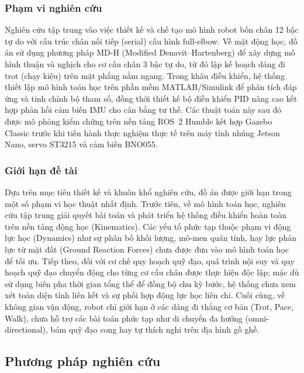\subsubsection*{Phạm vi nghiên cứu}

Nghiên cứu tập trung vào việc thiết kế và chế tạo mô hình robot bốn chân 12 bậc tự do với cấu trúc chân nối tiếp (serial) cấu hình full-elbow. Về mặt động học, đồ án sử dụng phương pháp MD-H (Modified Denavit--Hartenberg) để xây dựng mô hình thuận và nghịch cho cơ cấu chân 3 bậc tự do, từ đó lập kế hoạch dáng đi trot (chạy kiệu) trên mặt phẳng nằm ngang. Trong khâu điều khiển, hệ thống thiết lập mô hình toán học trên phần mềm MATLAB/Simulink để phân tích đáp ứng và tinh chỉnh bộ tham số, đồng thời thiết kế bộ điều khiển PID nâng cao kết hợp phản hồi cảm biến IMU cho cân bằng tư thế. Các thuật toán này sau đó được mô phỏng kiểm chứng trên nền tảng ROS~2 Humble kết hợp Gazebo Classic trước khi tiến hành thực nghiệm thực tế trên máy tính nhúng Jetson Nano, servo ST3215 và cảm biến BNO055.

\subsubsection*{Giới hạn đề tài}

Dựa trên mục tiêu thiết kế và khuôn khổ nghiên cứu, đồ án được giới hạn trong một số phạm vi học thuật nhất định. Trước tiên, về mô hình toán học, nghiên cứu tập trung giải quyết bài toán và phát triển hệ thống điều khiển hoàn toàn trên nền tảng động học (Kinematics). Các yếu tố phức tạp thuộc phạm vi động lực học (Dynamics) như sự phân bố khối lượng, mô-men quán tính, hay lực phản lực từ mặt đất (Ground Reaction Forces) chưa được đưa vào mô hình toán học để tối ưu. Tiếp theo, đối với cơ chế quy hoạch quỹ đạo, quá trình nội suy và quy hoạch quỹ đạo chuyển động cho từng cơ cấu chân được thực hiện độc lập; mặc dù sử dụng biến pha thời gian tổng thể để đồng bộ chu kỳ bước, hệ thống chưa xem xét toàn diện tính liên kết và sự phối hợp động lực học liên chi. Cuối cùng, về không gian vận động, robot chỉ giới hạn ở các dáng đi thẳng cơ bản (Trot, Pace, Walk), chưa hỗ trợ các bài toán phức tạp như di chuyển đa hướng (omni-directional), bám quỹ đạo cong hay tự thích nghi trên địa hình gồ ghề.

\subsection{Phương pháp nghiên cứu}

